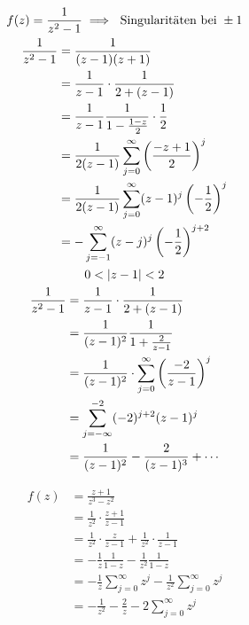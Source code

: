 \begin{bsp*}
	\begin{gather*}
		f(z) = \frac{1}{z^2 - 1} \implies \text{ Singularitäten bei } \pm 1 \\
		\begin{split}
			\frac{1}{z^2 - 1}
				&= \frac{1}{(z-1)(z+1)} \\
				&= \frac{1}{z-1} \cdot \frac{1}{2 + (z-1)} \\
				&= \frac{1}{z-1} \frac{1}{1 - \frac{1-z}{2}} \cdot \frac{1}{2} \\
				&= \frac{1}{2(z-1)} \sum_{j=0}^{\infty} \left( \frac{-z + 1}{2} \right)^j \\
				&= \frac{1}{2(z-1)} \sum_{j=0}^{\infty} (z-1)^j \left( -\frac{1}{2} \right)^j \\
				&= -\sum_{j=-1}^{\infty} (z-j)^j \left( -\frac{1}{2} \right)^{j+2}
		\end{split} \\
		0 < \abs{z-1} < 2 \\
		\begin{split}
			\frac{1}{z^2 - 1}
				&= \frac{1}{z-1} \cdot \frac{1}{2 + (z-1)} \\
				&= \frac{1}{(z-1)^2} \frac{1}{1 + \frac{2}{z-1}} \\
				&= \frac{1}{(z-1)^2} \cdot \sum_{j=0}^{\infty} \left( \frac{-2}{z-1} \right)^j \\
				&= \sum_{j = -\infty}^{-2} (-2)^{j+2} (z-1)^j \\
				&= \frac{1}{(z-1)^2} - \frac{2}{(z-1)^3} + \dotsb
		\end{split}
	\end{gather*}
\end{bsp*}
\begin{bsp*}
	\[ \begin{split}
		f(z)
			&= \frac{z+1}{z^3 - z^2} \\
			&= \frac{1}{z^2} \cdot \frac{z+1}{z-1} \\
			&= \frac{1}{z^2} \cdot \frac{z}{z-1} + \frac{1}{z^2} \cdot \frac{1}{z-1} \\
			&= -\frac{1}{z} \frac{1}{1-z} - \frac{1}{z^2} \frac{1}{1-z} \\
			&= -\frac{1}{z} \sum_{j=0}^{\infty} z^j - \frac{1}{z^2} \sum_{j=0}^{\infty} z^j \\
			&= -\frac{1}{z^2} - \frac{2}{z} - 2 \sum_{j=0}^{\infty} z^j
	\end{split} \]
\end{bsp*}


